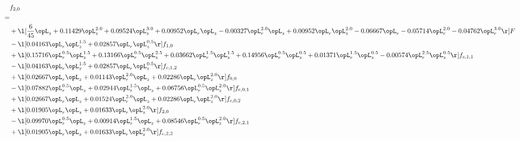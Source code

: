 \begin{alignat}{2} 
\label{eq:f_20_1} 
& f_{2,0} \nonumber \\ 
 = \\ 
& + \l[ \frac{6}{45} \opL_z +  0.11429 \opL_z^{2.0} +  0.09524 \opL_z^{3.0} +  0.00952 \opL_r \opL_z   -0.00327 \opL_r^{2.0} \opL_z +  0.00952 \opL_r \opL_z^{2.0}   -0.06667 \opL_r   -0.05714 \opL_r^{2.0}   -0.04762 \opL_r^{3.0}  \r] F \nonumber \\ 
& - \l[  0.04163 \opL_r \opL_z^{1.5} +  0.02857 \opL_r \opL_z^{0.5}  \r] f_{1,0} \nonumber \\ 
& + \l[  0.15716 \opL_r^{0.5} \opL_z^{1.5} +  0.13166 \opL_r^{0.5} \opL_z^{2.5} +  0.03662 \opL_r^{1.5} \opL_z^{1.5} +  0.14956 \opL_r^{0.5} \opL_z^{0.5} +  0.01371 \opL_r^{1.5} \opL_z^{0.5}   -0.00574 \opL_r^{2.5} \opL_z^{0.5}  \r] f_{c,1,1} \nonumber \\ 
& - \l[  0.04163 \opL_r \opL_z^{1.5} +  0.02857 \opL_r \opL_z^{0.5}  \r] f_{c,1,2} \nonumber \\ 
& + \l[  0.02667 \opL_r \opL_z +  0.01143 \opL_r^{2.0} \opL_z +  0.02286 \opL_r \opL_z^{2.0}  \r] f_{0,0} \nonumber \\ 
& - \l[  0.07882 \opL_r^{0.5} \opL_z +  0.02944 \opL_r^{1.5} \opL_z +  0.06756 \opL_r^{0.5} \opL_z^{2.0}  \r] f_{c,0,1} \nonumber \\ 
& + \l[  0.02667 \opL_r \opL_z +  0.01524 \opL_r^{2.0} \opL_z +  0.02286 \opL_r \opL_z^{2.0}  \r] f_{c,0,2} \nonumber \\ 
& + \l[  0.01905 \opL_r \opL_z +  0.01633 \opL_r \opL_z^{2.0}  \r] f_{2,0} \nonumber \\ 
& - \l[  0.09970 \opL_r^{0.5} \opL_z +  0.00914 \opL_r^{1.5} \opL_z +  0.08546 \opL_r^{0.5} \opL_z^{2.0}  \r] f_{c,2,1} \nonumber \\ 
& + \l[  0.01905 \opL_r \opL_z +  0.01633 \opL_r \opL_z^{2.0}  \r] f_{c,2,2} \nonumber \\ 
\end{alignat} 


